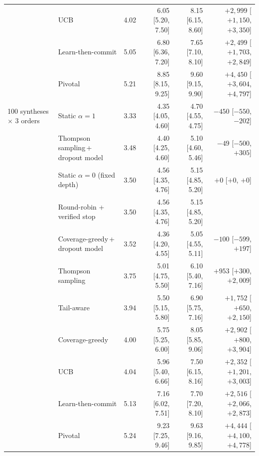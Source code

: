 \begin{table}[!t]
\begin{tabular}{@{}llrrrr@{}}
 & UCB & 4.02 & 6.05 [5.20, 7.50] & 8.15 [6.15, 8.60] & $+2{,}999$ [$+1{,}150${,} $+3{,}350$] \\
 & Learn-then-commit & 5.05 & 6.80 [6.36, 7.20] & 7.65 [7.10, 8.10] & $+2{,}499$ [$+1{,}703${,} $+2{,}849$] \\
 & Pivotal & 5.21 & 8.85 [8.15, 9.25] & 9.60 [9.15, 9.90] & $+4{,}450$ [$+3{,}604${,} $+4{,}797$] \\
\midrule
100 syntheses $\times$ 3 orders & Static $\alpha{=}1$ & 3.33 & 4.35 [4.05, 4.60] & 4.70 [4.55, 4.75] & $-450$ [$-550${,} $-202$] \\
 & Thompson sampling\,+\,dropout model & 3.48 & 4.40 [4.25, 4.60] & 5.10 [4.60, 5.46] & $-49$ [$-500${,} $+305$] \\
 & Static $\alpha{=}0$ (fixed depth) & 3.50 & 4.56 [4.35, 4.76] & 5.15 [4.85, 5.20] & $+0$ [$+0${,} $+0$] \\
 & Round-robin + verified stop & 3.50 & 4.56 [4.35, 4.76] & 5.15 [4.85, 5.20] &  \\
 & Coverage-greedy\,+\,dropout model & 3.52 & 4.36 [4.20, 4.55] & 5.05 [4.55, 5.11] & $-100$ [$-599${,} $+197$] \\
 & Thompson sampling & 3.75 & 5.01 [4.75, 5.50] & 6.10 [5.40, 7.16] & $+953$ [$+300${,} $+2{,}009$] \\
 & Tail-aware & 3.94 & 5.50 [5.15, 5.80] & 6.90 [5.75, 7.16] & $+1{,}752$ [$+650${,} $+2{,}150$] \\
 & Coverage-greedy & 4.00 & 5.75 [5.25, 6.00] & 8.05 [5.85, 9.06] & $+2{,}902$ [$+800${,} $+3{,}904$] \\
 & UCB & 4.04 & 5.96 [5.40, 6.66] & 7.50 [6.15, 8.16] & $+2{,}352$ [$+1{,}201${,} $+3{,}003$] \\
 & Learn-then-commit & 5.13 & 7.16 [6.02, 7.51] & 7.70 [7.20, 8.10] & $+2{,}516$ [$+2{,}066${,} $+2{,}873$] \\
 & Pivotal & 5.24 & 9.23 [7.25, 9.46] & 9.63 [9.16, 9.85] & $+4{,}444$ [$+4{,}100${,} $+4{,}778$] \\
\bottomrule
\end{tabular}
\end{table}
